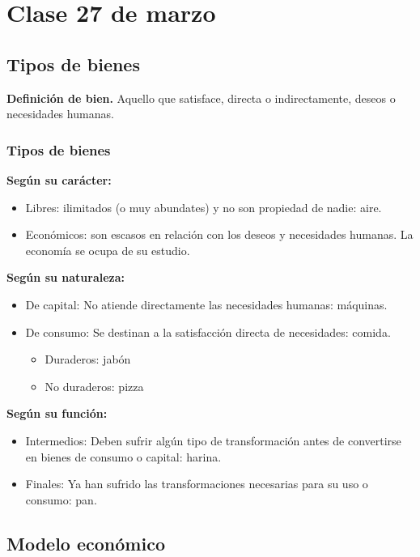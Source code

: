 \section{Clase 27 de marzo}

\subsection{Tipos de bienes}

\textbf{Definición de bien.}
Aquello que satisface, directa o indirectamente, deseos o necesidades humanas.

\subsubsection{Tipos de bienes}

\textbf{Según su carácter:}
\begin{itemize}
    \item Libres: ilimitados (o muy abundates) y no son propiedad de nadie: aire.
    \item Económicos: son escasos en relación con los deseos y necesidades humanas.
    La economía se ocupa de su estudio.
\end{itemize}

\textbf{Según su naturaleza:}
\begin{itemize}
    \item De capital: 
    No atiende directamente las necesidades humanas:
    máquinas.
    \item De consumo:
    Se destinan a la satisfacción directa de necesidades:
    comida.
    \begin{itemize}
        \item Duraderos: jabón
        \item No duraderos: pizza
    \end{itemize}
\end{itemize}

\textbf{Según su función:}
\begin{itemize}
    \item Intermedios:
    Deben sufrir algún tipo de transformación antes de convertirse en bienes de consumo o capital: harina.
    \item Finales:
    Ya han sufrido las transformaciones necesarias para su uso o consumo: pan.
\end{itemize}

\subsection{Modelo económico}

